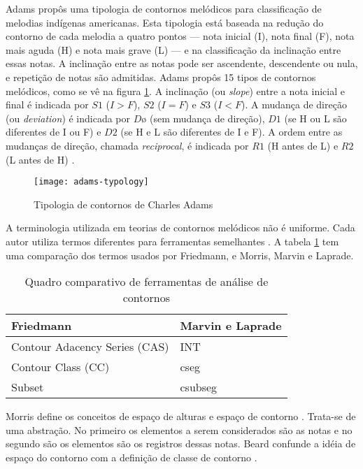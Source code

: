 \documentclass[12pt,brazil]{book}
\newcommand{\eng}[1]{\textit{#1}}
\begin{document}
Adams propôs uma tipologia de contornos melódicos para classificação
de melodias indígenas americanas. Esta tipologia está baseada na
redução do contorno de cada melodia a quatro pontos --- nota inicial
(I), nota final (F), nota mais aguda (H) e nota mais grave (L) --- e
na classificação da inclinação entre essas notas. A inclinação entre
as notas pode ser ascendente, descendente ou nula, e repetição de
notas são admitidas. Adams propôs 15 tipos de contornos melódicos,
como se vê na figura \ref{fig:adams-typology}. A inclinação (ou
\eng{slope}) entre a nota inicial e final é indicada por $S1$ ($I >
F$), $S2$ ($I = F$) e $S3$ ($I < F$). A mudança de direção (ou
\eng{deviation}) é indicada por $Dø$ (sem mudança de direção), $D1$
(se H ou L são diferentes de I ou F) e $D2$ (se H e L são diferentes
de I e F). A ordem entre as mudanças de direção, chamada
\eng{reciprocal}, é indicada por $R1$ (H antes de L) e $R2$ (L antes
de H) \cite{adams76:melodic}.

\begin{figure}
  \centering
  \texttt{[image: adams-typology]}
  \caption{Tipologia de contornos de Charles Adams
    \cite{adams76:melodic}}
  \label{fig:adams-typology}
\end{figure}

A terminologia utilizada em teorias de contornos melódicos não é
uniforme. Cada autor utiliza termos diferentes para ferramentas
semelhantes \cite{friedmann87:response}. A tabela
\ref{tab:compara-ferramentas} tem uma comparação dos termos usados por
Friedmann, e Morris, Marvin e Laprade.

\begin{table}
  \centering
  \begin{tabular}{l|l}
    Friedmann & Marvin e Laprade \\ \hline
    Contour Adacency Series (CAS) & INT \\
    Contour Class (CC) & cseg \\
    Subset & csubseg 
  \end{tabular}
  \caption{Quadro comparativo de ferramentas de análise de contornos}
  \label{tab:compara-ferramentas}
\end{table}

Morris define os conceitos de espaço de alturas e espaço de contorno
\cite{morris87:composition}. Trata-se de uma abstração. No primeiro os
elementos a serem considerados são as notas e no segundo são os
elementos são os registros dessas notas. Beard confunde a idéia de
espaço do contorno com a definição de classe de contorno
\cite[p. 11]{beard03:contour}.
\end{document}
